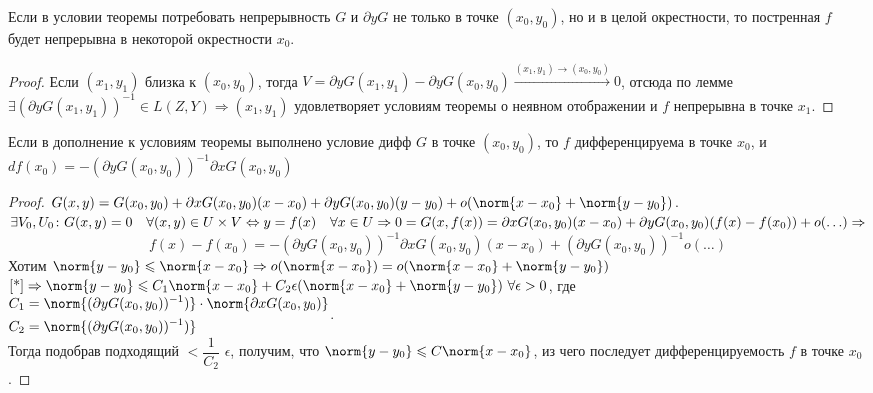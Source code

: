 \begin{theorem}
    Если в условии теоремы  потребовать непрерывность $G$ и $\partial y G$ не только в точке $(x_0, y_0)$, но и в целой окрестности, то постренная $f$ будет непрерывна в некоторой окрестности $x_0$.
\end{theorem}
\begin{proof}
    Если $(x_1, y_1)$ близка к $(x_0, y_0)$, тогда $V = \partial y G(x_1, y_1) - \partial y G(x_0, y_0) \stackrel{(x_1, y_1) \to (x_0, y_0)}{\longrightarrow} 0$, отсюда по лемме $\exists (\partial y G(x_1, y_1))^{-1} \in L(Z, Y) \Rightarrow (x_1, y_1)$ удовлетворяет условиям теоремы о неявном отображении и $f$ непрерывна в точке $x_1$.
\end{proof}

\begin{theorem}
    Если в дополнение к условиям теоремы  выполнено условие дифф $G$ в точке $(x_0, y_0)$, то $f$ дифференцируема в точке $x_0$, и $d f(x_0) = - (\partial y G(x_0, y_0))^{-1} \partial x G(x_0, y_0)$
\end{theorem}
\begin{proof}
    $G(x,y) = G(x_0, y_0) + \partial x G(x_0, y_0) (x - x_0) + \partial y G(x_0, y_0) (y - y_0) + o (\norm{x - x_0} + \norm{y - y_0})$.\\
    $\exists V_0, U_0 \colon G(x, y) = 0 \quad \forall (x, y) \in U \times V \Leftrightarrow y = f(x) \quad \forall x \in U \Rightarrow \\ 0 = G(x, f(x)) = \partial x G(x_0, y_0) (x - x_0) + \partial y G(x_0, y_0) (f(x) - f(x_0)) + o(\ldots) \Rightarrow$
    \begin{equation}
        \label{*}
        f(x) - f(x_0) = - (\partial y G(x_0, y_0))^{-1} \partial x G(x_0, y_0) (x - x_0) + (\partial y G(x_0, y_0))^{-1}o(\ldots)
    \end{equation}
    Хотим $\norm{y - y_0} \leqslant \norm{x - x_0} \Rightarrow o(\norm{x - x_0}) = o(\norm{x - x_0} + \norm{y - y_0})$\\
    $\ref{*} \Rightarrow \norm{y - y_0} \leqslant C_1 \norm{x - x_0} + C_2\epsilon (\norm{x - x_0} + \norm{y - y_0}) \ \forall \epsilon > 0$, где\\
    $\begin{aligned}
    C_1 &= \norm{(\partial y G(x_0, y_0))^{-1})} \cdot \norm{\partial x G(x_0, y_0)} \\
    C_2 &= \norm{(\partial y G(x_0, y_0))^{-1})}
    \end{aligned}$.\\
    Тогда подобрав подходящий $< \dfrac{1}{C_2}$ $\epsilon$, получим, что $\norm{y - y_0} \leqslant C \norm{x - x_0}$, из чего последует дифференцируемость $f$ в точке $x_0$.
\end{proof}

